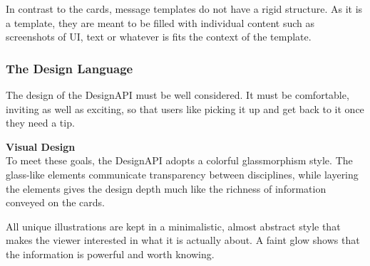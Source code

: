 In contrast to the cards, message templates do not have a rigid structure. As it is a template, they
are meant to be filled with individual content such as screenshots of UI, text or whatever is fits
the context of the template.

\subsubsection{The Design Language}


% 


The design of the DesignAPI must be well considered. It must be comfortable, inviting as well as
exciting, so that users like picking it up and get back to it once they need a tip.

\textbf{Visual Design}\\
To meet these goals, the DesignAPI adopts a colorful glassmorphism style. The glass-like elements
communicate transparency between disciplines, while layering the elements gives the design depth
much like the richness of information conveyed on the cards.

All unique illustrations are kept in a minimalistic, almost abstract style that makes the viewer
interested in what it is actually about. A faint glow shows that the information is powerful and
worth knowing.


